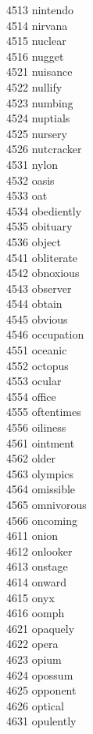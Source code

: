 4513 nintendo \\
4514 nirvana \\
4515 nuclear \\
4516 nugget \\
4521 nuisance \\
4522 nullify \\
4523 numbing \\
4524 nuptials \\
4525 nursery \\
4526 nutcracker \\
4531 nylon \\
4532 oasis \\
4533 oat \\
4534 obediently \\
4535 obituary \\
4536 object \\
4541 obliterate \\
4542 obnoxious \\
4543 observer \\
4544 obtain \\
4545 obvious \\
4546 occupation \\
4551 oceanic \\
4552 octopus \\
4553 ocular \\
4554 office \\
4555 oftentimes \\
4556 oiliness \\
4561 ointment \\
4562 older \\
4563 olympics \\
4564 omissible \\
4565 omnivorous \\
4566 oncoming \\
4611 onion \\
4612 onlooker \\
4613 onstage \\
4614 onward \\
4615 onyx \\
4616 oomph \\
4621 opaquely \\
4622 opera \\
4623 opium \\
4624 opossum \\
4625 opponent \\
4626 optical \\
4631 opulently \\
